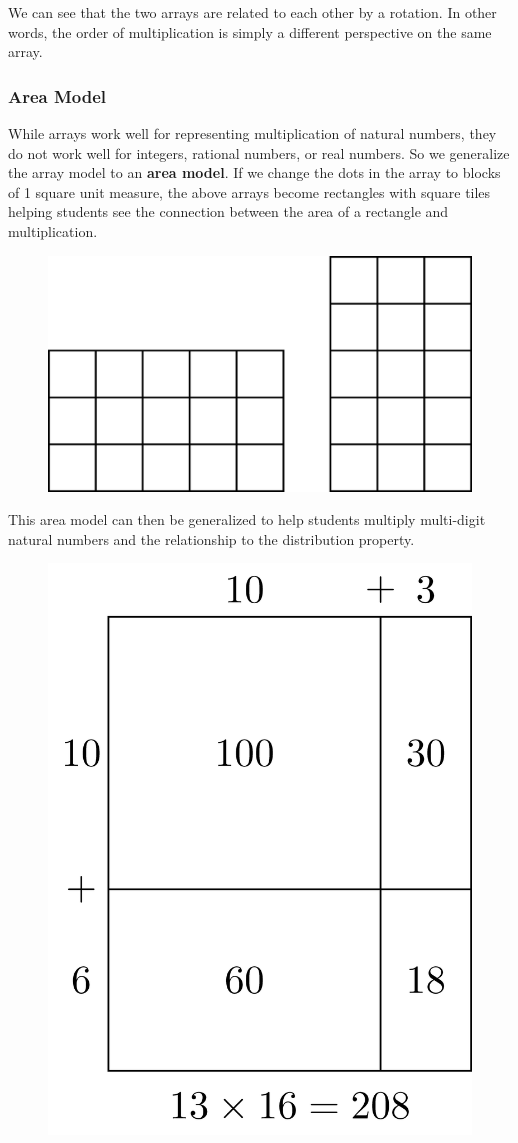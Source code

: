 \documentclass[
]{book}
\theoremstyle{definition}
\theoremstyle{definition}
\theoremstyle{definition}
\theoremstyle{definition}
\theoremstyle{remark}
\begin{document}
We can see that the two arrays are related to each other by a rotation. In other words, the order of multiplication is simply a different perspective on the same array.

\hypertarget{area-model}{%
\subsubsection*{Area Model}\label{area-model}}

While arrays work well for representing multiplication of natural numbers, they do not work well for integers, rational numbers, or real numbers. So we generalize the array model to an \textbf{area model}. If we change the dots in the array to blocks of 1 square unit measure, the above arrays become rectangles with square tiles helping students see the connection between the area of a rectangle and multiplication.

\begin{figure}

{\centering \includegraphics[width=0.5\linewidth]{tikz/area-model-3by5} 

}

\end{figure}

This area model can then be generalized to help students multiply multi-digit natural numbers and the relationship to the distribution property.

\begin{figure}

{\centering \includegraphics[width=0.4\linewidth]{tikz/area-model-13-16} 

}

\end{figure}
\end{document}
